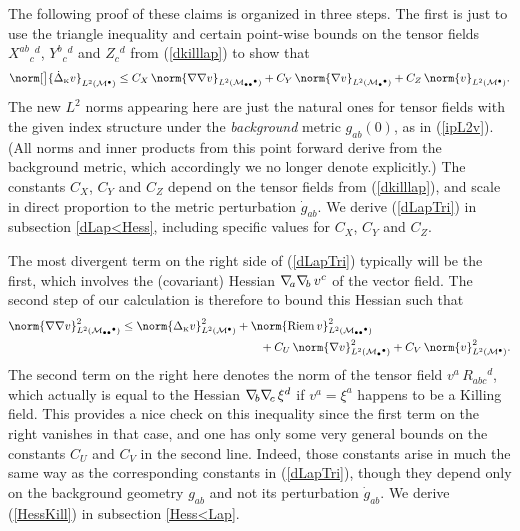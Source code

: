 \documentclass[12pt,letterpaper]{iopart}
\newcommand\Lap[1][K]{\Delta_{\scriptscriptstyle\mathrm{#1}}}
\newcommand\dLap[1][K]{\dot\Delta_{\scriptscriptstyle\mathrm{#1}}}
\newcommand\M{\mathcal{M}}
\newcommand\ind{{\bullet}}
\DeclareMathOperator\Riem{Riem}
\begin{document}
The following proof of these claims is organized in three steps.  The first is just to use the triangle inequality and certain point-wise bounds on the tensor fields $X^{ab}{}_c{}^d$, $Y^b{}_c{}^d$ and $Z_c{}^d$ from (\ref{dkilllap}) to show that 
%
\begin{equation}\label{dLapTri}
	\norm[\big]{\dLap v}_{L^2(\M^\ind)} \le 
		C_X\, \norm{\grad\grad v}_{L^2(\M_{\ind\ind}{}^\ind)}
		+ C_Y\, \norm{\grad v}_{L^2(\M_\ind{}^\ind)}
		+ C_Z\, \norm{v}_{L^2(\M^\ind)}.
\end{equation}
%
The new $L^2$ norms appearing here are just the natural ones for tensor fields with the given index structure under the \textit{background} metric $g_{ab}(0)$, as in (\ref{ipL2v}).  (All norms and inner products from this point forward derive from the background metric, which accordingly we no longer denote explicitly.)  The constants $C_X$, $C_Y$ and $C_Z$ depend on the tensor fields from (\ref{dkilllap}), and scale in direct proportion to the metric perturbation $\dot g_{ab}$.  We derive (\ref{dLapTri}) in subsection \ref{dLap<Hess}, including specific values for $C_X$, $C_Y$ and $C_Z$.

The most divergent term on the right side of (\ref{dLapTri}) typically will be the first, which involves the (covariant) Hessian $\nabla\!_a \nabla\!_b\, v^c$ of the vector field.  The second step of our calculation is therefore to bound this Hessian such that 
%
\begin{align}\label{HessKill}
	\norm{\grad\grad v}^2_{L^2(\M_{\ind\ind}{}^\ind)} \le 
		\norm{\Lap v}^2_{L^2(\M^\ind)}
		&+ \norm{\Riem v}^2_{L^2(\M_{\ind\ind}{}^\ind)}
		\notag\\&\hspace{2em}
		+ C_U\, \norm{\grad v}^2_{L^2(\M_\ind{}^\ind)} 
		+ C_V\, \norm{v}^2_{L^2(\M^\ind)}.
\end{align}
%
The second term on the right here denotes the norm of the tensor field $v^a\, R_{abc}{}^d$, which actually is equal to the Hessian $\nabla\!_b \nabla\!_c\, \xi^d$ if $v^a = \xi^a$ happens to be a Killing field.  This provides a nice check on this inequality since the first term on the right vanishes in that case, and one has only some very general bounds on the constants $C_U$ and $C_V$ in the second line.  Indeed, those constants arise in much the same way as the corresponding constants in (\ref{dLapTri}), though they depend only on the background geometry $g_{ab}$ and not its perturbation $\dot g_{ab}$.  We derive (\ref{HessKill}) in subsection \ref{Hess<Lap}.
\end{document}
